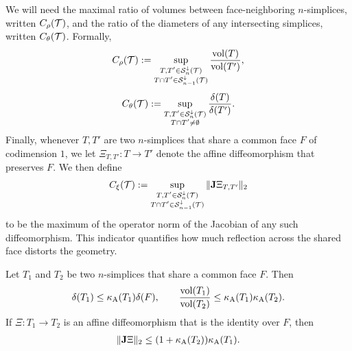 \documentclass[10pt,a4paper]{article}
\begin{document}
We will need the maximal ratio of volumes between face-neighboring $n$-simplices, written $C_\rho({\mathcal T})$,
and the ratio of the diameters of any intersecting simplices, written $C_\theta({\mathcal T})$. Formally, 
\begin{align}\label{math:volumeratio}
    C_\rho({\mathcal T}) 
    := 
    \sup_{ \substack{ T, T' \in {\mathcal S}^{\downarrow}_{n}({\mathcal T}) \\ T \cap T' \in {\mathcal S}^{\downarrow}_{n-1}({\mathcal T}) } } 
    \frac{ \operatorname{vol}(T) }{ \operatorname{vol}(T') }
    ,
\end{align}
\begin{align}\label{math:diameterratio}
    C_\theta({\mathcal T}) 
    := 
    \sup_{ \substack{ T, T' \in {\mathcal S}^{\downarrow}_{n}({\mathcal T}) \\ T \cap T' \neq \emptyset } }
    \frac{ {\delta}(T) }{ {\delta}(T') }
    .
\end{align}
Finally, whenever $T, T'$ are two $n$-simplices that share a common face $F$ of codimension $1$, we let $\Xi_{T,T'} : T \rightarrow T'$ denote the affine diffeomorphism 
that preserves $F$. We then define 
\begin{align}\label{math:reflectionmeasure}
    C_\xi({\mathcal T}) 
    := 
    \sup_{ \substack{ T, T' \in {\mathcal S}^{\downarrow}_{n}({\mathcal T}) \\ T \cap T' \in {\mathcal S}^{\downarrow}_{n-1}({\mathcal T}) } }
    \|  {\mathbf{J}} \Xi_{T,T'}  \|_{2}
\end{align}
to be the maximum of the operator norm of the Jacobian of any such diffeomorphism. 
This indicator quantifies how much reflection across the shared face distorts the geometry. 

\begin{lemma}\label{lemma:volumecomparison}
    Let $T_1$ and $T_2$ be two $n$-simplices that share a common face $F$. Then 
    \begin{align*}
        {\delta}(T_1)
        \leq 
        \kappa_{\rm A}(T_1)
        {\delta}(F)
        ,
        \qquad 
        \frac{ \operatorname{vol}(T_1) }{ \operatorname{vol}(T_2) }
        \leq 
        \kappa_{\rm A}(T_1) \kappa_{\rm A}(T_2)
        .
    \end{align*}
    If $\Xi : T_1 \rightarrow T_2$ is an affine diffeomorphism that is the identity over $F$, then 
    \begin{align*}
        \|  {\mathbf{J}} \Xi  \|_{2}
        \leq 
        ( 1 + \kappa_{\rm A}(T_2) ) \kappa_{\rm A}(T_1)
        .
    \end{align*}
\end{lemma}
\end{document}
